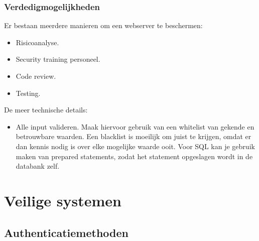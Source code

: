 \documentclass{report}
\begin{document}
	\subsubsection{Verdedigmogelijkheden}
	Er bestaan meerdere manieren om een webserver te beschermen:
	\begin{itemize}
		\item[\info] Risicoanalyse.
		\item[\info] Security training personeel.
		\item[\info] Code review.
		\item[\info] Testing.
	\end{itemize}
	De meer technische details:
	\begin{itemize}
		\item[\info] Alle input valideren. Maak hiervoor gebruik van een whitelist van gekende en betrouwbare waarden. Een blacklist is moeilijk om juist te krijgen, omdat er dan kennis nodig is over elke mogelijke waarde ooit. Voor SQL kan je gebruik maken van prepared statements, zodat het statement opgeslagen wordt in de databank zelf.
	\end{itemize}
	\section{Veilige systemen}
	\subsection{Authenticatiemethoden}
\end{document}
